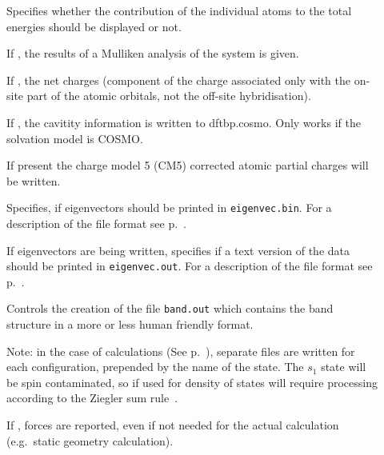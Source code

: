 \begin{description}

\item[] Specifies whether the contribution of the
  individual atoms to the total energies should be displayed or not.

\item[] If , the results of a Mulliken analysis of
  the system is given.

\item[] If , the net charges (component of the
  charge associated only with the on-site part of the atomic orbitals, not the
  off-site hybridisation).

\item[] If , the cavitity information is
  written to dftbp.cosmo. Only works if the solvation model is COSMO.

\item[] If present the charge model 5 (CM5)\cite{marenich2012} corrected
  atomic partial charges will be written.

\item[] Specifies, if eigenvectors should be printed in
  \verb|eigenvec.bin|. For a description of the file format see
  p.~.

\item[] If eigenvectors are being written, specifies if a
  text version of the data should be printed in \verb|eigenvec.out|. For a
  description of the file format see p.~.

\item[] Controls the creation of the file
  \verb|band.out| which contains the band structure in a more or less
  human friendly format.

  Note: in the case of  calculations (See
  p.~), separate files are written for each
  configuration, prepended by the name of the state. The $s_1$ state
  will be spin contaminated, so if used for density of states will
  require processing according to the Ziegler sum
  rule~\cite{baerends-TCA-43-261}.

\item[] If , forces are reported, even if not needed
  for the actual calculation (e.g.\ static geometry calculation).


\end{description}
